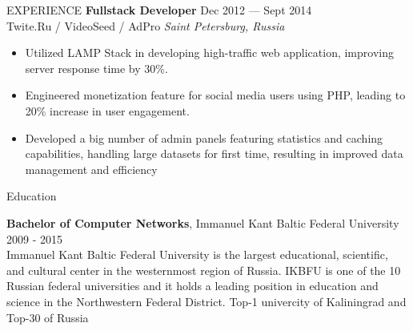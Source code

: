 \documentclass{template} %
\begin{document}
\begin{rSection}{EXPERIENCE}
 \textbf{Fullstack Developer} \hfill Dec 2012 --- Sept 2014\\
 Twite.Ru / VideoSeed / AdPro \hfill \textit{Saint Petersburg, Russia}
 \begin{itemize}
    \itemsep -3pt {} 
     \item Utilized LAMP Stack in developing high-traffic web application, improving server response time by 30\%.
     \item Engineered monetization feature for social media users using PHP, leading to 20\% increase in user engagement.
     \item Developed a big number of admin panels featuring statistics and caching capabilities, handling large datasets for first time, resulting in improved data management and efficiency
 \end{itemize}

\end{rSection} 


\begin{rSection}{Education}

{\bf Bachelor of Computer Networks}, Immanuel Kant Baltic Federal University \hfill {2009 - 2015} \vspace{0.2cm}\\
Immanuel Kant Baltic Federal University is the largest educational, scientific, and cultural center in the westernmost region of Russia. IKBFU is one of the 10 Russian federal universities and it holds a leading position in education and science in the Northwestern Federal District.
Top-1 univercity of Kaliningrad and Top-30 of Russia \\

\end{rSection}

\end{document}
